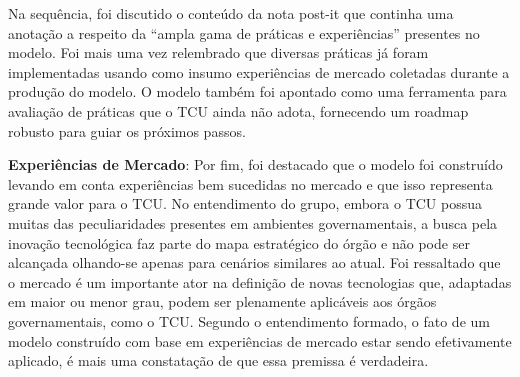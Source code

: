{
\color{red}

Na sequência, foi discutido o conteúdo da nota post-it que continha uma anotação
a respeito da “ampla gama de práticas e experiências” presentes no modelo. Foi mais
uma vez relembrado que diversas práticas já foram implementadas usando como insumo
experiências de mercado coletadas durante a produção do modelo. O modelo também foi
apontado como uma ferramenta para avaliação de práticas que o TCU ainda não adota,
fornecendo um roadmap robusto para guiar os próximos passos.

\textbf{Experiências de Mercado}: Por fim, foi destacado que o modelo foi construído
levando em conta experiências bem
sucedidas no mercado e que isso representa grande valor para o TCU. No entendimento
do grupo, embora o TCU possua muitas das peculiaridades presentes em ambientes governamentais,
a busca pela inovação tecnológica faz parte do mapa estratégico do órgão e
não pode ser alcançada olhando-se apenas para cenários similares ao atual. Foi ressaltado
que o mercado é um importante ator na definição de novas tecnologias que, adaptadas em
maior ou menor grau, podem ser plenamente aplicáveis aos órgãos governamentais, como
o TCU. Segundo o entendimento formado, o fato de um modelo construído com base em
experiências de mercado estar sendo efetivamente aplicado, é mais uma constatação de
que essa premissa é verdadeira.
}


